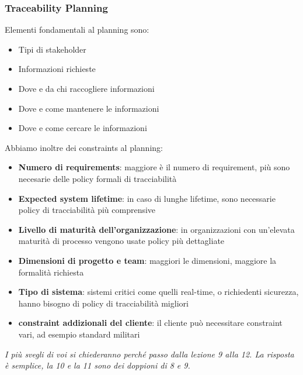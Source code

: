 \documentclass[11pt]{article}
\begin{document}
\subsubsection{Traceability Planning}
Elementi fondamentali al planning sono:
\begin{itemize}
    \item Tipi di stakeholder
    \item Informazioni richieste
    \item Dove e da chi raccogliere informazioni
    \item Dove e come mantenere le informazioni 
    \item Dove e come cercare le informazioni
\end{itemize}
Abbiamo inoltre dei \glspl{constraint} al planning: 
\begin{itemize}
    \item \textbf{Numero di requirements}: maggiore è il numero di requirement, più sono necesarie delle policy formali di tracciabilità
    \item \textbf{Expected system lifetime}: in caso di lunghe lifetime, sono necessarie policy di tracciabilità più comprensive
    \item \textbf{Livello di maturità dell'organizzazione}: in organizzazioni con un'elevata maturità di processo vengono usate policy più dettagliate
    \item \textbf{Dimensioni di progetto e team}: maggiori le dimensioni, maggiore la formalità richiesta
    \item \textbf{Tipo di sistema}: sistemi critici come quelli real-time, o richiedenti sicurezza, hanno bisogno di policy di tracciabilità migliori
    \item \textbf{\Gls{constraint} addizionali del cliente}: il cliente può necessitare \gls{constraint} vari, ad esempio standard militari
\end{itemize}
\textit{I più svegli di voi si chiederanno perché passo dalla lezione 9 alla 12. La risposta è semplice, la 10 e la 11 sono dei doppioni di 8 e 9.}
\end{document}
